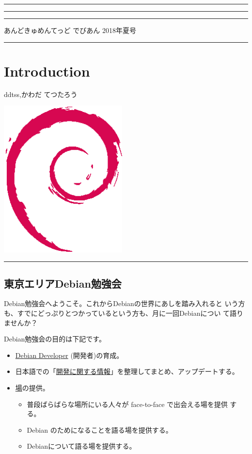 \documentclass[mingoth,a4paper]{jsarticle}
\renewcommand{\dancersection}[2]{%
\newpage
あんどきゅめんてっど でびあん 2018年夏号
%
\vspace{0.1mm}\\
{\color{dancerdarkblue}\rule{\hsize}{2mm}}

%
%
\begin{minipage}[t]{0.6\hsize}
\color{dancerdarkblue}
\vspace{1cm}
\section{#1}
\hfill{}#2\\
\end{minipage}
\begin{minipage}[t]{0.4\hsize}
\vspace{-2cm}
\hfill{}\includegraphics[height=8cm]{image200502/openlogo-nd.eps}\\
\vspace{-5cm}
\end{minipage}
%
{\color{dancerlightblue}\rule{0.66\hsize}{2mm}}
%
\vspace{2cm}
}
\begin{document}
\setcounter{page}{1}
\begin{minipage}[]{0.2\hsize}
 \colorbox{dancerlightblue}{}
\end{minipage}
\begin{minipage}[]{0.8\hsize}
\hrule
\vspace{1mm}
\hrule
\setcounter{tocdepth}{1}
{\small
\begin{multicols}{2}
  \tableofcontents
\end{multicols}
} %
\vspace{1mm}
\hrule
\vspace{3cm}

\end{minipage}

\dancersection{Introduction}{ddtss,かわだ てつたろう}

\subsection{東京エリアDebian勉強会}

 Debian勉強会へようこそ。これからDebianの世界にあしを踏み入れると
 いう方も、すでにどっぷりとつかっているという方も、月に一回Debianについ
 て語りませんか？

 Debian勉強会の目的は下記です。

\begin{itemize}
 \item \underline{Debian Developer} (開発者)の育成。
 \item 日本語での「\underline{開発に関する情報}」を整理してまとめ、アップデートする。
 \item \underline{場}の提供。
 \begin{itemize}
  \item 普段ばらばらな場所にいる人々が face-to-face で出会える場を提供
	する。
  \item Debian のためになることを語る場を提供する。
  \item Debianについて語る場を提供する。
 \end{itemize}
\end{itemize}
\end{document}
